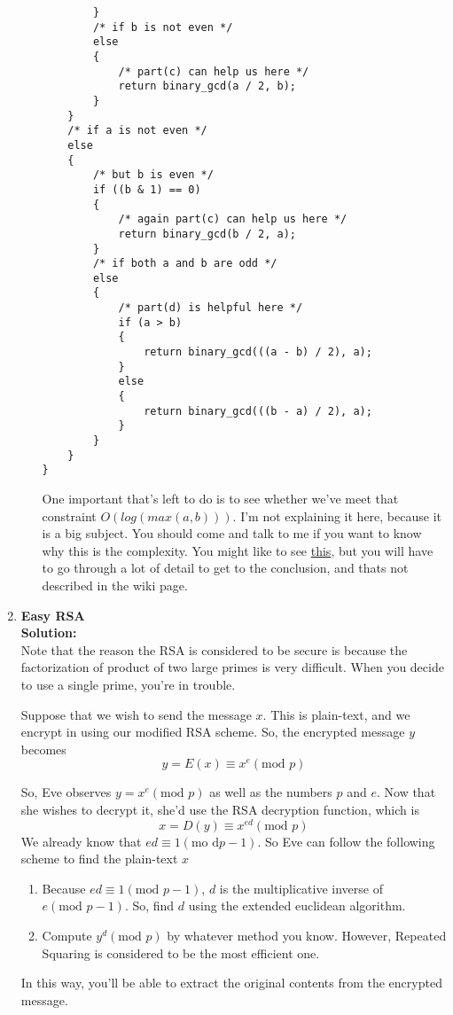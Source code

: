\documentclass[11pt]{article}
\begin{document}
\begin{enumerate}
\begin{enumerate}
\begin{lstlisting}
		}
		/* if b is not even */
		else
		{
			/* part(c) can help us here */
			return binary_gcd(a / 2, b);
		}
	}
	/* if a is not even */
	else
	{
		/* but b is even */
		if ((b & 1) == 0)
		{
			/* again part(c) can help us here */
			return binary_gcd(b / 2, a);
		}
		/* if both a and b are odd */
		else
		{
			/* part(d) is helpful here */
			if (a > b)
			{
				return binary_gcd(((a - b) / 2), a);
			}
			else
			{
				return binary_gcd(((b - a) / 2), a);
			}
		}
	}
}
\end{lstlisting}
				
		One important that's left to do is to see whether we've meet that constraint $O(log(max(a, b)))$. I'm not explaining it here, because it is a big subject. You should come and talk to me if you want to know why this is the complexity. You might like to see \href{https://en.wikipedia.org/wiki/Binary_GCD_algorithm#Efficiency}{this}, but you will have to go through a lot of detail to get to the conclusion, and thats not described in the wiki page.  
				
				
			\end{enumerate}
		
		
		\item \textbf{Easy RSA} \\
		\textbf{Solution: } \\
		Note that the reason the RSA is considered to be secure is because the factorization of product of two large primes is very difficult. When you decide to use a single prime, you're in trouble. 
		
		Suppose that we wish to send the message $x$. This is plain-text, and we encrypt in using our modified RSA scheme. So, the encrypted message $y$ becomes
					$$y = E(x) \equiv x^e (\text{mod  } p)$$  
		
		So, Eve observes $y = x^e (\text{mod  } p)$ as well as the numbers $p$ and $e$. Now that she wishes to decrypt it, she'd use the RSA decryption function, which is
					$$x = D(y) \equiv x^{ed} (\text{mod  } p)$$
		We already know that $ed \equiv 1 (\text{mo  d} p-1)$. So Eve can follow the following scheme to find the plain-text $x$
		
				\begin{enumerate}
					\item Because $ed \equiv 1 (\text{mod  } p-1)$, $d$ is the multiplicative inverse of $e (\text{mod  } p-1)$. So, find $d$ using the extended euclidean algorithm.  
					\item Compute $y^d (\text{mod  } p)$ by whatever method you know. However, Repeated Squaring is considered to be the most efficient one. 
				\end{enumerate}
		In this way, you'll be able to extract the original contents from the encrypted message. 
		

\end{enumerate}
\end{document}
